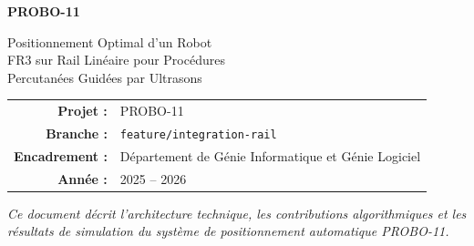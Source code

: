 \documentclass[11pt, a4paper]{article}
\newcommand{\ros}{\texttt{ROS\,2}}
\newcommand{\FR}{FR3}
\begin{document}
\begin{titlepage}
  \pagecolor{PrimaryBlue}
  \color{white}
  \begin{center}
    \vspace*{2cm}


    \vspace{1.5cm}

    {\Huge\bfseries\sffamily PROBO-11}

    \vspace{0.4cm}

    {\LARGE\sffamily Positionnement Optimal d'un Robot\\[0.3em]
      \FR{} sur Rail Linéaire pour Procédures\\[0.3em]
      Percutanées Guidées par Ultrasons}

    \vspace{1.2cm}


    \vspace{2cm}

    \begin{tabular}{rl}
      \textbf{Projet :}     & PROBO-11 \\[4pt]
      \textbf{Branche :}    & \texttt{feature/integration-rail} \\[4pt]
      \textbf{Encadrement :}& Département de Génie Informatique et Génie Logiciel \\[4pt]
      \textbf{Année :}      & 2025 -- 2026 \\[4pt]
    \end{tabular}

    \vfill


    \vspace{1cm}

    {\small\sffamily\itshape
      Ce document décrit l'architecture technique, les contributions algorithmiques
      et les résultats de simulation du système de positionnement automatique PROBO-11.}

  \end{center}
\end{titlepage}
\end{document}
